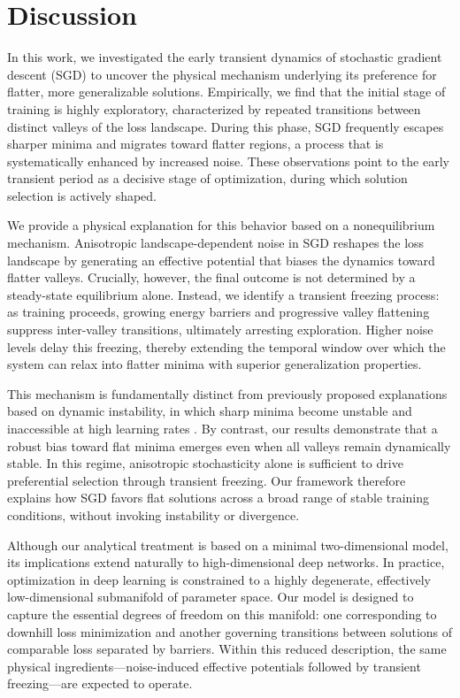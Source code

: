 \documentclass[aps,prx,reprint,superscriptaddress,longbibliography,nofootinbib,floatfix]{revtex4-2}
\begin{document}
\section{Discussion}
In this work, we investigated the early transient dynamics of stochastic gradient descent (SGD) to uncover the physical mechanism underlying its preference for flatter, more generalizable solutions. Empirically, we find that the initial stage of training is highly exploratory, characterized by repeated transitions between distinct valleys of the loss landscape. During this phase, SGD frequently escapes sharper minima and migrates toward flatter regions, a process that is systematically enhanced by increased noise. These observations point to the early transient period as a decisive stage of optimization, during which solution selection is actively shaped.

We provide a physical explanation for this behavior based on a nonequilibrium mechanism. Anisotropic landscape-dependent noise in SGD reshapes the loss landscape by generating an effective potential that biases the dynamics toward flatter valleys. Crucially, however, the final outcome is not determined by a steady-state equilibrium alone. Instead, we identify a transient freezing process: as training proceeds, growing energy barriers and progressive valley flattening suppress inter-valley transitions, ultimately arresting exploration. Higher noise levels delay this freezing, thereby extending the temporal window over which the system can relax into flatter minima with superior generalization properties.

This mechanism is fundamentally distinct from previously proposed explanations based on dynamic instability, in which sharp minima become unstable and inaccessible at high learning rates \cite{wuHowSGDSelects2018}. By contrast, our results demonstrate that a robust bias toward flat minima emerges even when all valleys remain dynamically stable. In this regime, anisotropic stochasticity alone is sufficient to drive preferential selection through transient freezing. Our framework therefore explains how SGD favors flat solutions across a broad range of stable training conditions, without invoking instability or divergence.

Although our analytical treatment is based on a minimal two-dimensional model, its implications extend naturally to high-dimensional deep networks. In practice, optimization in deep learning is constrained to a highly degenerate, effectively low-dimensional submanifold of parameter space. Our model is designed to capture the essential degrees of freedom on this manifold: one corresponding to downhill loss minimization and another governing transitions between solutions of comparable loss separated by barriers. Within this reduced description, the same physical ingredients—noise-induced effective potentials followed by transient freezing—are expected to operate.
\end{document}
